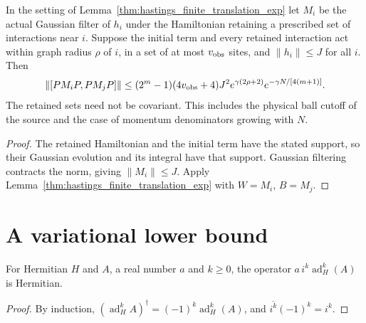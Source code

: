 \begin{lemma}
    \label{cor:hastings_finite_translation_truncated}
    \leanok
    In the setting of Lemma~\ref{thm:hastings_finite_translation_exp} let $M_i$ be the actual Gaussian filter
    of $h_i$ under the Hamiltonian retaining a prescribed set of
    interactions near $i$. Suppose the initial term and every retained
    interaction act within graph radius $\rho$ of $i$, in a set of
    at most $v_{\rm obs}$ sites, and $\|h_i\|\le J$ for all $i$.
    Then
    \[
        \|[PM_iP,PM_jP]\|
        \le (2^m-1)(4v_{\rm obs}+4)J^2
        e^{\gamma(2\rho+2)}e^{-\gamma N/[4(m+1)]}.
    \]
    The retained sets need not be covariant. This includes the
    physical ball cutoff of the source and the case of momentum
    denominators growing with $N$.
\end{lemma}
\begin{proof}\leanok
    The retained Hamiltonian and the initial term have the stated
    support, so their Gaussian evolution and its integral have that
    support. Gaussian filtering contracts the norm, giving
    $\|M_i\|\le J$. Apply Lemma~\ref{thm:hastings_finite_translation_exp} with $W=M_i$, $B=M_j$.
\end{proof}

\section{A variational lower bound}
\label{sec:translations_variational}

\begin{lemma}
    \label{thm:hastings_commutator_iter_hermitian}
    \leanok
    For Hermitian $H$ and $A$, a real number $a$ and $k\ge0$, the operator
    $a\,i^k\operatorname{ad}_H^k(A)$ is Hermitian.
\end{lemma}
\begin{proof}\leanok
    By induction, $(\operatorname{ad}_H^kA)^\dagger=(-1)^k\operatorname{ad}_H^k(A)$,
    and $\overline{i^k}(-1)^k=i^k$.
\end{proof}

